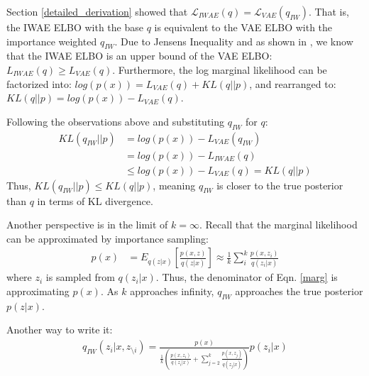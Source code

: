 \documentclass{article} %
\begin{document}
Section \ref{detailed_derivation} showed that $\mathcal{L}_{IWAE}(q) = \mathcal{L}_{VAE}(q_{IW})$. That is, the IWAE ELBO with the base $q$ is equivalent to the VAE ELBO with the importance weighted $q_{IW}$. Due to Jensen\textquotesingle s Inequality and as shown in \cite{burda2015importance}, we know that the IWAE ELBO is an upper bound of the VAE ELBO: ${L}_{IWAE}(q) \geq {L}_{VAE}(q)$. Furthermore, the log marginal likelihood can be factorized into: $log(p(x)) = {L}_{VAE}(q) + KL(q||p)$, and rearranged to: $KL(q||p) = log(p(x)) - {L}_{VAE}(q)$.

Following the observations above and substituting $q_{IW}$ for $q$:
\begin{align} 
    KL(q_{IW}||p) &= log(p(x)) - {L}_{VAE}(q_{IW}) \\
    &= log(p(x)) - {L}_{IWAE}(q) \\
    &\leq log(p(x)) - {L}_{VAE}(q) = KL(q||p)
\end{align}
Thus, $KL(q_{IW}||p) \leq KL(q||p)$, meaning $q_{IW}$ is closer to the true posterior than $q$ in terms of KL divergence. 

Another perspective is in the limit of ${k=\infty}$. Recall that the marginal likelihood can be approximated by importance sampling:
\begin{align} 
    p(x) &= E_{q(z|x)}\left[\frac{p(x,z)}{q(z|x)} \right] \approx \frac{1}{k}\sum_i^k \frac{p(x,z_i)}{q(z_i|x)}
\end{align}
where $z_i$ is sampled from $q(z_i|x)$. Thus, the denominator of Eqn. \ref{marg} is approximating $p(x)$. As $k$ approaches infinity, $q_{IW}$ approaches the true posterior $p(z|x)$.





Another way to write it:
\begin{align}
q_{IW}(z_i|x,z_{\setminus i}) =  \frac{p(x)}{  \frac{1}{k} \left( \frac{p(x,z_i)}{q(z_i|x)}+ \sum_{j=2}^k \frac{p(x,z_j)}{q(z_j|x)} \right) }  p(z_i|x)
\end{align}
\end{document}
